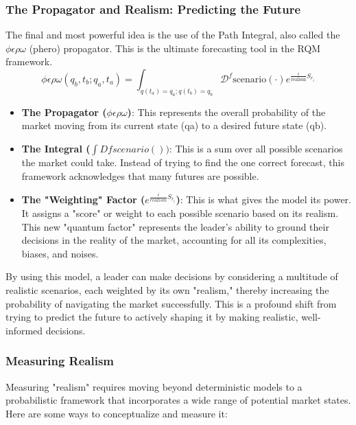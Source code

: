 \documentclass{article}
\begin{document}
\subsubsection*{The Propagator and Realism: Predicting the Future}
The final and most powerful idea is the use of the Path Integral, also called the $\phi \epsilon \rho \omega$ (phero) propagator. This is the ultimate forecasting tool in the RQM framework.
\begin{equation}
\phi\epsilon\rho\omega(q_b, t_b; q_a, t_a) = \int_{q(t_a)=q_a; q(t_b)=q_b} \mathcal{D}^f \text{scenario}(\cdot) e^{\frac{i}{\text{realism}} S_{r_i}}
\end{equation}
\begin{itemize}
\item \textbf{The Propagator ($\phi \epsilon \rho \omega$)}: This represents the overall probability of the market moving from its current state (qa) to a desired future state (qb).
\item \textbf{The Integral ($\int Dfscenario())$}: This is a sum over all possible scenarios the market could take. Instead of trying to find the one correct forecast, this framework acknowledges that many futures are possible.
\item \textbf{The "Weighting" Factor ($e^{\frac{i}{realism} S_{r_i}}
$)}: This is what gives the model its power. It assigns a "score" or weight to each possible scenario based on its realism. This new "quantum factor" represents the leader's ability to ground their decisions in the reality of the market, accounting for all its complexities, biases, and noises.
\end{itemize}
By using this model, a leader can make decisions by considering a multitude of realistic scenarios, each weighted by its own "realism," thereby increasing the probability of navigating the market successfully. This is a profound shift from trying to predict the future to actively shaping it by making realistic, well-informed decisions.

\subsubsection*{Measuring Realism}
Measuring "realism" requires moving beyond deterministic models to a probabilistic framework that incorporates a wide range of potential market states. Here are some ways to conceptualize and measure it:
 
\end{document}
